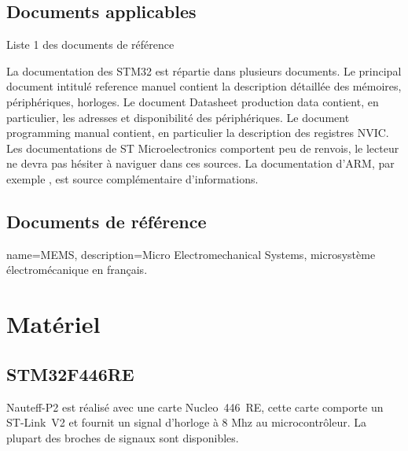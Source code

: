 \documentclass[a4paper,11pt]{report}
\begin{document}
\section{Documents applicables}
\printbibliography[keyword=REF, heading=none]

Liste 1 des documents de référence


La documentation des STM32 est répartie dans plusieurs documents.
Le principal document intitulé reference manuel \cite{STM32F446RM} contient
la description détaillée des mémoires, périphériques, horloges. 
Le document Datasheet production data \cite{STM32F446xCE} contient, en particulier, les adresses et disponibilité des périphériques.
Le document programming manual\cite{STM32M4PM} contient, en particulier
la description des registres NVIC.
Les documentations de ST Microelectronics comportent peu de renvois,
le lecteur ne devra pas hésiter à naviguer dans ces sources.
La documentation d'ARM, par exemple \cite{CORTEXM4TRM}, est source
complémentaire d'informations.


\section{Documents de référence}
\printbibliography[keyword=REF, heading=none]

\printglossary[numberedsection, title=Terminologie]

{
  name={MEMS},
  description={Micro Electromechanical Systems, microsystème électromécanique en français.}
}

\chapter{Matériel}
\section{STM32F446RE}
Nauteff-P2 est réalisé avec une carte Nucleo~446~RE, cette carte comporte un ST-Link~V2 et fournit un signal d'horloge à 8 Mhz au microcontrôleur. La plupart des broches de signaux sont disponibles.
\end{document}
